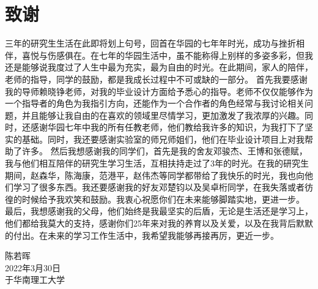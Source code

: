 \chapter{致\texorpdfstring{\quad}{}谢}

三年的研究生生活在此即将划上句号，回首在华园的七年年时光，成功与挫折相伴，喜悦与伤感俱在。在七年的华园生活中，虽不能称得上别样的多姿多彩，但我还是能够说我度过了人生中最为充实，最为自由的时光。在此期间，家人的陪伴，老师的指导，同学的鼓励，都是我成长过程中不可或缺的一部分。
首先我要感谢我的导师赖晓铮老师，对我的毕业设计方面给予悉心的指导。老师不仅仅能够作为一个指导者的角色为我指引方向，还能作为一个合作者的角色经常与我讨论相关问题，并且能够让我自由的在喜欢的领域里尽情学习，更加激发了我浓厚的兴趣。同时，还感谢华园七年中我的所有任教老师，他们教给我许多的知识，为我打下了坚实的基础。同时，我还要感谢实验室的师兄师姐们，他们在毕业设计项目上对我帮助了许多。
然后我想感谢我的同学们，首先是我的舍友邓骏杰、王博和张德赋，我与他们相互陪伴的研究生学习生活，互相扶持走过了3年的时光。在我的研究生期间，赵森华，陈海康，范港平，赵伟杰等同学都带给了我快乐的时光，我也向他们学习了很多东西。我还要感谢我的好友邓楚钧以及吴卓桁同学，在我失落或者彷徨的时候给予我欢笑和鼓励。我衷心祝愿你们在未来能够脚踏实地，更进一步。
最后，我想感谢我的父母，他们始终是我最坚实的后盾，无论是生活还是学习上，他们都给我莫大的支持，感谢你们25年来对我的养育以及关爱，以及在我背后默默的付出。在未来的学习工作生活中，我希望我能够再接再厉，更近一步。

\begin{minipage}[t]{0.945\textwidth}%
	\begin{flushright}
		陈若晖\\
		2022年3月30日\\	%
		于华南理工大学
		\par\end{flushright}
\end{minipage}

